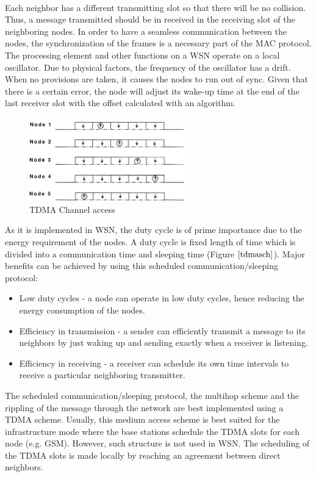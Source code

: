 \documentclass[a4paper,10pt]{report}
\begin{document}
\paragraph*{}
Each neighbor has a different transmitting slot so that there will be no collision. Thus, a message transmitted should be in received in the receiving slot of the neighboring nodes. In order to have a seamless communication between the nodes, the synchronization of the frames is a necessary part of the MAC protocol. The processing element and other functions on a WSN operate on a local oscillator. Due to physical factors, the frequency of the oscillator has a drift. When no provisions are taken, it causes the nodes to run out of sync. Given that there is a certain error, the node will adjust its wake-up time at the end of the last receiver slot with the offset calculated with an algorithm. \paragraph*{}
\begin{figure}
\centering
\includegraphics[width=0.6\textwidth]{tdmaschedule}
\caption{TDMA Channel access} \label{tdmasch}
\end{figure}
As it is implemented in WSN, the duty cycle is of prime importance due to the energy requirement of the nodes. A duty cycle is fixed length of time which is divided into a communication time and sleeping time (Figure $\ref{tdmasch}$). Major benefits can be achieved
by using this scheduled communication/sleeping protocol:
\begin{itemize}
\item Low duty cycles - a node can operate in low duty cycles, hence reducing the energy consumption of the nodes.
\item Efficiency in transmission - a sender can efficiently transmit a message to its neighbors by just waking up and sending exactly when a receiver is listening.
\item Efficiency in receiving - a receiver can schedule its own time intervals to receive a particular neighboring transmitter.
\end{itemize}
The scheduled communication/sleeping protocol, the multihop scheme and the rippling of the message through the network are best implemented using a TDMA scheme. Usually, this medium access scheme is best suited for the infrastructure mode where the base stations schedule the TDMA slots for each node (e.g. GSM). However, such structure is not used in WSN. The scheduling of the TDMA slots is made locally by reaching an agreement between direct neighbors.
\end{document}

